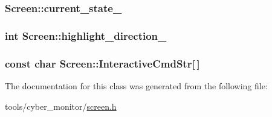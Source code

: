 \hypertarget{classScreen_a0ea09ea5eadc990cdcd32068c377287d}{
\subsubsection[{current\-\_\-state\-\_\-}]{ Screen\-::current\-\_\-state\-\_\-\hspace{0.3cm}{\ttfamily [private]}}}\label{classScreen_a0ea09ea5eadc990cdcd32068c377287d}
\hypertarget{classScreen_a69a30640ab25485d9f769e3a37bf8639}{
\subsubsection[{highlight\-\_\-direction\-\_\-}]{\setlength{\rightskip}{0pt plus 5cm}int Screen\-::highlight\-\_\-direction\-\_\-\hspace{0.3cm}{\ttfamily [private]}}}\label{classScreen_a69a30640ab25485d9f769e3a37bf8639}
\hypertarget{classScreen_aeaa4372d83cf381da26b0f06be0c08f2}{
\subsubsection[{Interactive\-Cmd\-Str}]{\setlength{\rightskip}{0pt plus 5cm}const char Screen\-::\-Interactive\-Cmd\-Str\mbox{[}$\,$\mbox{]}\hspace{0.3cm}{\ttfamily [static]}}}\label{classScreen_aeaa4372d83cf381da26b0f06be0c08f2}


The documentation for this class was generated from the following file\-:\begin{DoxyCompactItemize}
\item 
tools/cyber\-\_\-monitor/\hyperlink{screen_8h}{screen.\-h}\end{DoxyCompactItemize}
